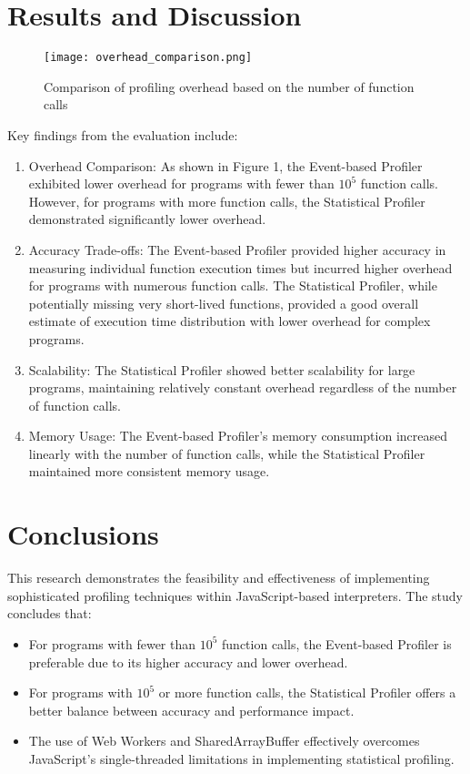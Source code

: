 \documentclass[a4paper,10pt]{article}
\begin{document}
\section*{Results and Discussion}
\begin{figure}[H]
    \centering
    \texttt{[image: overhead\_comparison.png]}
    \caption{Comparison of profiling overhead based on the number of function calls}
\end{figure}

Key findings from the evaluation include:

\begin{enumerate}
    \item Overhead Comparison: As shown in Figure 1, the Event-based Profiler exhibited lower overhead for programs with fewer than $10^5$ function calls. However, for programs with more function calls, the Statistical Profiler demonstrated significantly lower overhead.
    
    \item Accuracy Trade-offs: The Event-based Profiler provided higher accuracy in measuring individual function execution times but incurred higher overhead for programs with numerous function calls. The Statistical Profiler, while potentially missing very short-lived functions, provided a good overall estimate of execution time distribution with lower overhead for complex programs.
    
    \item Scalability: The Statistical Profiler showed better scalability for large programs, maintaining relatively constant overhead regardless of the number of function calls.
    
    \item Memory Usage: The Event-based Profiler's memory consumption increased linearly with the number of function calls, while the Statistical Profiler maintained more consistent memory usage.
\end{enumerate}

\section*{Conclusions}
This research demonstrates the feasibility and effectiveness of implementing sophisticated profiling techniques within JavaScript-based interpreters. The study concludes that:

\begin{itemize}
    \item For programs with fewer than $10^5$ function calls, the Event-based Profiler is preferable due to its higher accuracy and lower overhead.
    \item For programs with $10^5$ or more function calls, the Statistical Profiler offers a better balance between accuracy and performance impact.
    \item The use of Web Workers and SharedArrayBuffer effectively overcomes JavaScript's single-threaded limitations in implementing statistical profiling.
\end{itemize}
\end{document}
